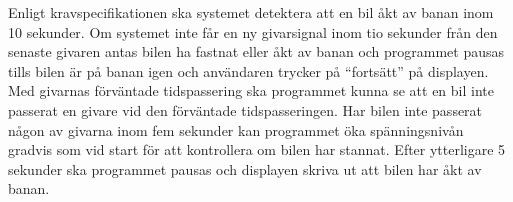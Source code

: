 Enligt kravspecifikationen ska systemet detektera att en bil åkt av banan inom 10 sekunder. Om systemet
inte får en ny givarsignal inom tio sekunder från den senaste givaren antas bilen ha
fastnat eller åkt av banan och programmet pausas tills bilen är på banan igen
och användaren trycker på ``fortsätt'' på displayen. Med givarnas förväntade tidspassering ska programmet kunna se att en bil inte passerat en givare vid den förväntade tidspasseringen. Har bilen inte passerat någon av givarna inom fem sekunder kan programmet öka spänningsnivån gradvis som vid start för att kontrollera om bilen har stannat. Efter ytterligare 5 sekunder ska programmet pausas och displayen skriva ut att bilen har åkt av banan.

